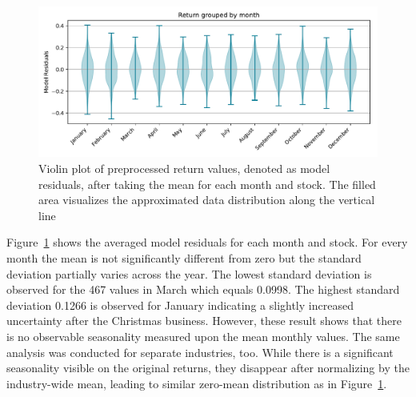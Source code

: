 
\begin{figure}[!ht]
    \centering
    \includegraphics[width=\textwidth]{figures/regression/returns-per-month.pdf}
    \caption{Violin plot of preprocessed return values, denoted as model residuals, after taking the mean for each month and stock. The filled area visualizes the approximated data distribution along the vertical line}
    \label{fig:boxplot_seasons}
\end{figure}

Figure~\ref{fig:boxplot_seasons} shows the averaged model residuals for each month and stock. For every month the mean is not significantly different from zero but the standard deviation partially varies across the year. The lowest standard deviation is observed for the 467 values in March which equals 0.0998. The highest standard deviation 0.1266 is observed for January indicating a slightly increased uncertainty after the Christmas business. However, these result shows that there is no observable seasonality measured upon the mean monthly values. The same analysis was conducted for separate industries, too. While there is a significant seasonality visible on the original returns, they disappear after normalizing by the industry-wide mean, leading to similar zero-mean distribution as in Figure~\ref{fig:boxplot_seasons}.


